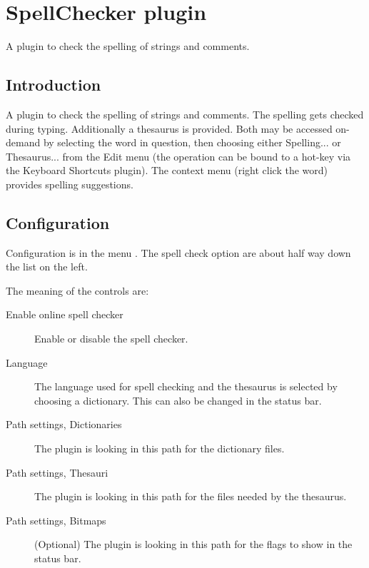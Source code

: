 \section{SpellChecker plugin}\label{sec:spell_checker}

A plugin to check the spelling of strings and comments.

\subsection{Introduction}
A plugin to check the spelling of strings and comments. The spelling gets checked during typing. Additionally a thesaurus is provided. Both may be accessed on-demand by selecting the word in question, then choosing either Spelling... or Thesaurus... from the Edit menu (the operation can be bound to a hot-key via the Keyboard Shortcuts plugin). The context menu (right click the word) provides spelling suggestions. 

\subsection{Configuration}

Configuration is in the menu . The spell check option are about half way down the list on the left.


The meaning of the controls are: 
\begin{description}
\item[Enable online spell checker] Enable or disable the spell checker.
\item[Language] The language used for spell checking and the thesaurus is selected by choosing a dictionary. This can also be changed in the status bar.
\item[Path settings, Dictionaries] The plugin is looking in this path for the dictionary files.
\item[Path settings, Thesauri] The plugin is looking in this path for the files needed by the thesaurus.
\item[Path settings, Bitmaps] (Optional) The plugin is looking in this path for the flags to show in the status bar.
\end{description}


